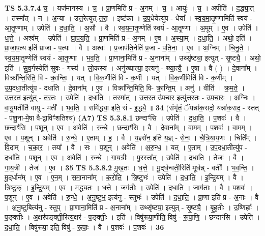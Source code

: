 \documentclass[17pt]{extarticle}
\begin{document}
                  \newline
                                \textbf{ TS 5.3.7.4} \newline
                  च॒ । यज॑मानस्य । च॒ । प्रा॒णमिति॑ प्र - अ॒नम् । च॒ । आयुः॑ । च॒ । अपीति॑ । द॒द्ध्या॒त् । तस्मा᳚त् । न । अ॒न्या । उत्त॒रेत्युत्-त॒रा॒ । इष्ट॑का । उ॒प॒धेयेत्यु॑प - धेया᳚ । स्व॒य॒मा॒तृ॒ण्णामिति॑ स्वयं - आ॒तृ॒ण्णाम् । उपेति॑ । द॒धा॒ति॒ । अ॒सौ । वै । स्व॒य॒मा॒तृ॒ण्णेति॑ स्वयं - आ॒तृ॒ण्णा । अ॒मूम् । ए॒व । उपेति॑ । ध॒त्ते॒ । अश्व᳚म् । उपेति॑ । घ्रा॒प॒य॒ति॒ । प्रा॒णमिति॑ प्र - अ॒नम् । ए॒व । अ॒स्या॒म् । द॒धा॒ति॒ । अथो॒ इति॑ । प्रा॒जा॒प॒त्य इति॑ प्राजा - प॒त्यः । वै । अश्वः॑ । प्र॒जाप॑ति॒नेति॑ प्र॒जा - प॒ति॒ना॒ । ए॒व । अ॒ग्निम् । चि॒नु॒ते॒ । स्व॒य॒मा॒तृ॒ण्णेति॑ स्वयं - आ॒तृ॒ण्णा । भ॒व॒ति॒ । प्रा॒णाना॒मिति॑ प्र - अ॒नाना᳚म् । उथ्सृ॑ष्ट्या॒ इत्युत् - सृ॒ष्ट्यै॒ । अथो॒ इति॑ । सु॒व॒र्गस्येति॑ सुवः - गस्य॑ । लो॒कस्य॑ । अनु॑ख्यात्या॒ इत्यनु॑ - ख्या॒त्यै॒ । ए॒षा । वै ( ) । दे॒वाना᳚म् । विक्रा᳚न्ति॒रिति॒ वि - क्रा॒न्तिः॒ । यत् । वि॒क॒र्णीति॑ वि - क॒र्णी । यत् । वि॒क॒र्णीमिति॑ वि - क॒र्णीम् । उ॒प॒दधा॒तीत्यु॑प - दधा॑ति । दे॒वाना᳚म् । ए॒व । विक्रा᳚न्ति॒मिति॒ वि- क्रा॒न्ति॒म् । अनु॑ । वीति॑ । क्र॒म॒ते॒ । उ॒त्त॒र॒त इत्यु॑त् - त॒र॒तः । उपेति॑ । द॒धा॒ति॒ । तस्मा᳚त् । उ॒त्त॒र॒त उ॑पचार॒ इत्यु॑त्तर॒तः - उ॒प॒चा॒रः॒ । अ॒ग्निः । वा॒यु॒मतीति॑ वायु - मती᳚ । भ॒व॒ति॒ । समि॑द्ध्या॒ इति॒ सं - इ॒द्ध्यै॒ ॥ \textbf{  34} \newline
                  \newline
                      (संभृ॑तं॒ ॅयन्ना॑क॒सदो॒ यन्ना॑क॒सद॒ - स्तत् - प॑शू॒ना-मे॒षा वै-द्वाविꣳ॑शतिश्च)  \textbf{(A7)} \newline \newline
                                \textbf{ TS 5.3.8.1} \newline
                  छन्दाꣳ॑सि । उपेति॑ । द॒धा॒ति॒ । प॒शवः॑ । वै । छन्दाꣳ॑सि । प॒शून् । ए॒व । अवेति॑ । रु॒न्धे॒ । छन्दाꣳ॑सि । वै । दे॒वाना᳚म् । वा॒मम् । प॒शवः॑ । वा॒मम् । ए॒व । प॒शून् । अवेति॑ । रु॒न्धे॒ । ए॒ताम् । ह॒ । वै । य॒ज्ञ्से॑न॒ इति॑ य॒ज्ञ् - से॒नः॒ । चै॒त्रि॒या॒य॒णः । चिति᳚म् । वि॒दाम् । च॒का॒र॒ । तया᳚ । वै । सः । प॒शून् । अवेति॑ । अ॒रु॒न्ध॒ । यत् । ए॒ताम् । उ॒प॒दधा॒तीत्यु॑प - द॒धा॑ति । प॒शून् । ए॒व । अवेति॑ । रु॒न्धे॒ । गा॒य॒त्रीः । पु॒रस्ता᳚त् । उपेति॑ । द॒धा॒ति॒ । तेजः॑ । वै । गा॒य॒त्री । तेजः॑ । ए॒व । \textbf{  35} \newline
                  \newline
                                \textbf{ TS 5.3.8.2} \newline
                  मु॒ख॒तः । ध॒त्ते॒ । मू॒द्‌र्ध॒न्वती॒रिति॑ मूर्धन्न् - वतीः᳚ । भ॒व॒न्ति॒ । मू॒द्‌र्धान᳚म् । ए॒व । ए॒न॒म् । स॒मा॒नाना᳚म् । क॒रो॒ति॒ । त्रि॒ष्टुभः॑ । उपेति॑ । द॒धा॒ति॒ । इ॒न्द्रि॒यम् । वै । त्रि॒ष्टुक् । इ॒न्द्रि॒यम् । ए॒व । म॒द्ध्य॒तः । ध॒त्ते॒ । जग॑तीः । उपेति॑ । द॒धा॒ति॒ । जाग॑ताः । वै । प॒शवः॑ । प॒शून् । ए॒व । अवेति॑ । रु॒न्धे॒ । अ॒नु॒ष्टुभ॒ इत्य॑नु - स्तुभः॑ । उपेति॑ । द॒धा॒ति॒ । प्रा॒णा इति॑ प्र - अ॒नाः । वै । अ॒नु॒ष्टुबित्य॑नु - स्तुप् । प्रा॒णाना॒मिति॑ प्र -  अ॒नाना᳚म् । उथ्सृ॑ष्ट्या॒ इत्युत् - सृ॒ष्ट्यै॒ । बृ॒ह॒तीः । उ॒ष्णिहाः᳚ । प॒ङ्क्तीः । अ॒क्षर॑पङ्क्ती॒रित्य॒क्षर॑ - प॒ङ्क्तीः॒ । इति॑ । विषु॑रूपा॒णीति॒ विषु॑ - रू॒पा॒णि॒ । छन्दाꣳ॑सि । उपेति॑ । द॒धा॒ति॒ । विषु॑रूपा॒ इति॒ विषु॑ - रू॒पाः॒ । वै । प॒शवः॑ । प॒शवः॑ । \textbf{  36} \newline
\end{document}
